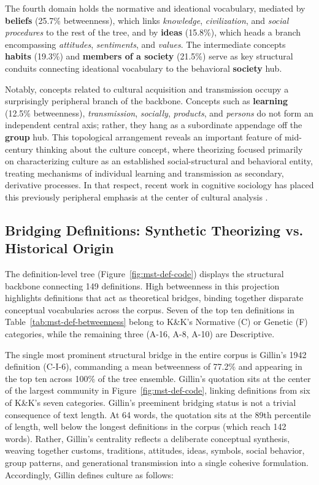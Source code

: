 \documentclass[11pt]{article}
\begin{document}
The fourth domain holds the normative and ideational vocabulary, mediated by \textbf{beliefs} (25.7\% betweenness), which links \emph{knowledge}, \emph{civilization}, and \emph{social procedures} to the rest of the tree, and by \textbf{ideas} (15.8\%), which heads a branch encompassing \emph{attitudes}, \emph{sentiments}, and \emph{values}. The intermediate concepts \textbf{habits} (19.3\%) and \textbf{members of a society} (21.5\%) serve as key structural conduits connecting ideational vocabulary to the behavioral \textbf{society} hub.

Notably, concepts related to cultural acquisition and transmission occupy a surprisingly peripheral branch of the backbone. Concepts such as \textbf{learning} (12.5\% betweenness), \emph{transmission}, \emph{socially}, \emph{products}, and \emph{persons} do not form an independent central axis; rather, they hang as a subordinate appendage off the \textbf{group} hub. This topological arrangement reveals an important feature of mid-century thinking about the culture concept, where theorizing focused primarily on characterizing culture as an established social-structural and behavioral entity, treating mechanisms of individual learning and transmission as secondary, derivative processes. In that respect, recent work in cognitive sociology has placed this previously peripheral emphasis at the center of cultural analysis \citep{lizardo2017improving-c29}.

\subsection{Bridging Definitions: Synthetic Theorizing vs. Historical Origin}

The definition-level tree (Figure~\ref{fig:mst-def-code}) displays the structural backbone connecting 149 definitions. High betweenness in this projection highlights definitions that act as theoretical bridges, binding together disparate conceptual vocabularies across the corpus. Seven of the top ten definitions in Table~\ref{tab:mst-def-betweenness} belong to K\&K's Normative (C) or Genetic (F) categories, while the remaining three (A-16, A-8, A-10) are Descriptive.

The single most prominent structural bridge in the entire corpus is Gillin's 1942 definition (C-I-6), commanding a mean betweenness of 77.2\% and appearing in the top ten across 100\% of the tree ensemble. Gillin's quotation sits at the center of the largest community in Figure~\ref{fig:mst-def-code}, linking definitions from six of K\&K's seven categories. Gillin's preeminent bridging status is not a trivial consequence of text length. At 64 words, the quotation sits at the 89th percentile of length, well below the longest definitions in the corpus (which reach 142 words). Rather, Gillin's centrality reflects a deliberate conceptual synthesis, weaving together customs, traditions, attitudes, ideas, symbols, social behavior, group patterns, and generational transmission into a single cohesive formulation. Accordingly, Gillin defines culture as follows:
\end{document}

